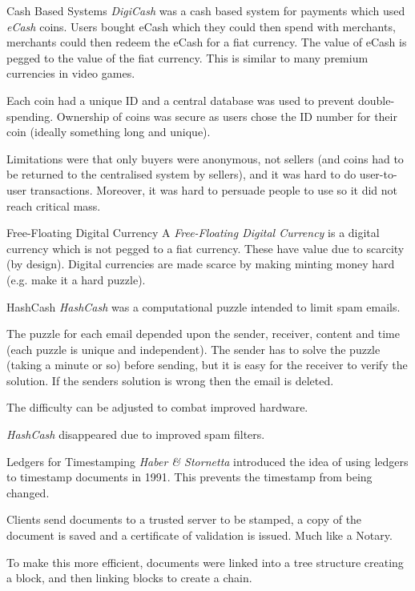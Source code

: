 \documentclass[11pt,a4paper]{article}
\begin{document}
  \begin{proposition}{Cash Based Systems}
    \textit{DigiCash} was a cash based system for payments which used \textit{eCash} coins. Users bought eCash which they could then spend with merchants, merchants could then redeem the eCash for a fiat currency. The value of eCash is pegged to the value of the fiat currency. This is similar to many premium currencies in video games.
    \par Each coin had a unique ID and a central database was used to prevent double-spending. Ownership of coins was secure as users chose the ID number for their coin (ideally something long and unique).
    \par Limitations were that only buyers were anonymous, not sellers (and coins had to be returned to the centralised system by sellers), and it was hard to do user-to-user transactions. Moreover, it was hard to persuade people to use so it did not reach critical mass.
  \end{proposition}

  \begin{remark}{Free-Floating Digital Currency}
    A \textit{Free-Floating Digital Currency} is a digital currency which is not pegged to a fiat currency. These have value due to scarcity (by design). Digital currencies are made scarce by making minting money hard (e.g. make it a hard puzzle).
  \end{remark}

  \begin{remark}{HashCash}
    \textit{HashCash} was a computational puzzle intended to limit spam emails.
    \par The puzzle for each email depended upon the sender, receiver, content and time (each puzzle is unique and independent). The sender has to solve the puzzle (taking a minute or so) before sending, but it is easy for the receiver to verify the solution. If the senders solution is wrong then the email is deleted.
    \par The difficulty can be adjusted to combat improved hardware.
    \par \textit{HashCash} disappeared due to improved spam filters.
  \end{remark}

  \begin{remark}{Ledgers for Timestamping}
    \textit{Haber \& Stornetta} introduced the idea of using ledgers to timestamp documents in 1991. This prevents the timestamp from being changed.
    \par Clients send documents to a trusted server to be stamped, a copy of the document is saved and a certificate of validation is issued. Much like a Notary.
    \par To make this more efficient, documents were linked into a tree structure creating a block, and then linking blocks to create a chain.
  \end{remark}
\end{document}
